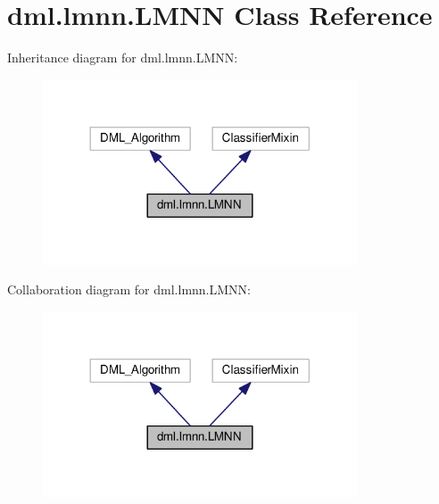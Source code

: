 \hypertarget{classdml_1_1lmnn_1_1LMNN}{}\section{dml.\+lmnn.\+L\+M\+NN Class Reference}
\label{classdml_1_1lmnn_1_1LMNN}


Inheritance diagram for dml.\+lmnn.\+L\+M\+NN\+:
\nopagebreak
\begin{figure}[H]
\begin{center}
\leavevmode
\includegraphics[width=264pt]{classdml_1_1lmnn_1_1LMNN__inherit__graph}
\end{center}
\end{figure}


Collaboration diagram for dml.\+lmnn.\+L\+M\+NN\+:
\nopagebreak
\begin{figure}[H]
\begin{center}
\leavevmode
\includegraphics[width=264pt]{classdml_1_1lmnn_1_1LMNN__coll__graph}
\end{center}
\end{figure}

